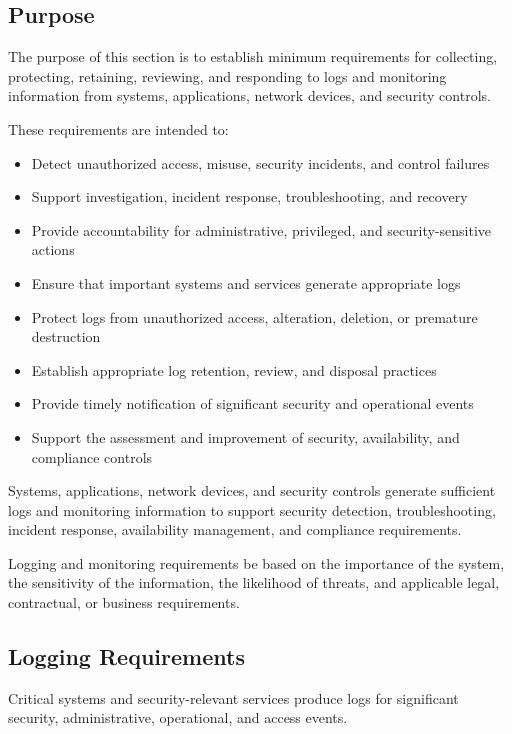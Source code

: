 \subsection{Purpose}

The purpose of this section is to establish minimum requirements for collecting, protecting, retaining, reviewing, and responding to logs and monitoring information from systems, applications, network devices, and security controls.

These requirements are intended to:
\begin{itemize}
    \item Detect unauthorized access, misuse, security incidents, and control failures
    \item Support investigation, incident response, troubleshooting, and recovery
    \item Provide accountability for administrative, privileged, and security-sensitive actions
    \item Ensure that important systems and services generate appropriate logs
    \item Protect logs from unauthorized access, alteration, deletion, or premature destruction
    \item Establish appropriate log retention, review, and disposal practices
    \item Provide timely notification of significant security and operational events
    \item Support the assessment and improvement of security, availability, and compliance controls
\end{itemize}

Systems, applications, network devices, and security controls \must{} generate sufficient logs and monitoring information to support security detection, troubleshooting, incident response, availability management, and compliance requirements.

Logging and monitoring requirements \must{} be based on the importance of the system, the sensitivity of the information, the likelihood of threats, and applicable legal, contractual, or business requirements.

\subsection{Logging Requirements}

Critical systems and security-relevant services \must{} produce logs for significant security, administrative, operational, and access events.

